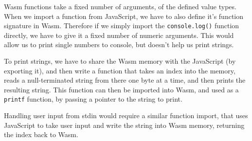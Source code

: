 \documentclass[10pt,a4paper]{article}
\begin{document}
Wasm functions take a fixed number of arguments, of the defined value types. When we import a function from JavaScript, we have to also define it's function signature in Wasm. Therefore if we simply import the \texttt{console.log()} function directly, we have to give it a fixed number of numeric arguments. This would allow us to print single numbers to console, but doesn't help us print strings.

To print strings, we have to share the Wasm memory with the JavaScript (by exporting it), and then write a function that takes an index into the memory, reads a null-terminated string from there one byte at a time, and then prints the resulting string. This function can then be imported into Wasm, and used as a \texttt{printf} function, by passing a pointer to the string to print.

Handling user input from stdin would require a similar function import, that uses JavaScript to take user input and write the string into Wasm memory, returning the index back to Wasm.
\end{document}

